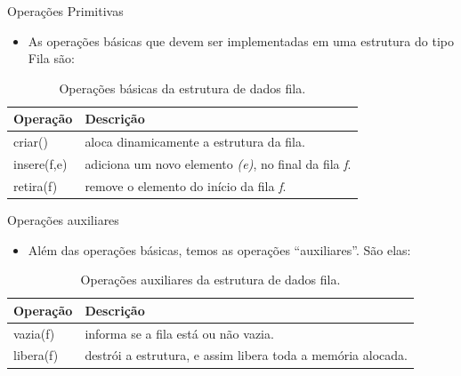 \begin{frame}{Operações Primitivas}
  \begin{itemize}
	  \item As operações básicas que devem ser implementadas em uma estrutura do tipo Fila são:		
  \end{itemize}
  \begin{table}[ht]
			  \centering
						\begin{tabular}{l|l}
						    \hline \textbf{Operação} & \textbf{Descrição} \\
						    \hline criar() & aloca dinamicamente a estrutura da fila.\\
						    \hline insere(f,e) & adiciona um novo elemento \textit{(e)}, no final da fila \textit{f}.\\
						    \hline retira(f) & remove o elemento do início da fila \textit{f}.\\						   
						    \hline 
						\end{tabular}
						\caption{Operações básicas da estrutura de dados fila.}
				\end{table}
\end{frame}
 
\begin{frame}{Operações auxiliares}   
			\begin{itemize}
				\item Além das operações básicas, temos as operações ``auxiliares''. São elas:
			\end{itemize}
			\begin{table}[ht]
			  \centering
						\begin{tabular}{l|l}
						    \hline \textbf{Operação} & \textbf{Descrição} \\						    
						    \hline vazia(f) & informa se a fila está ou não vazia.\\
						    \hline libera(f) & destrói a estrutura, e assim libera toda a memória alocada.\\
						    \hline 
						\end{tabular}
						\caption{Operações auxiliares da estrutura de dados fila.}
				\end{table}
  \end{frame}


